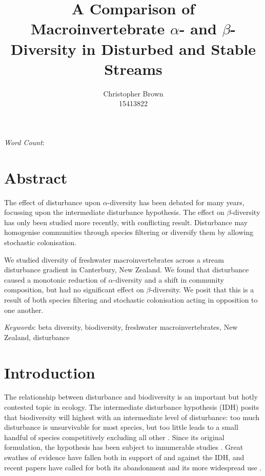 \documentclass[a4paper,10pt]{article}
\title{A Comparison of Macroinvertebrate $\alpha$- and $\beta$-Diversity in Disturbed and Stable Streams}
\author{
	Christopher Brown\\15413822
}
\date{}
\begin{document}
\maketitle

\begin{center}
	\emph{Word Count}: %
\end{center}

\section*{Abstract}

The effect of disturbance upon $\alpha$-diversity has been debated for many years, focussing upon the intermediate disturbance hypothesis.
The effect on $\beta$-diversity has only been studied more recently, with conflicting result.
Disturbance may homogenise communities through species filtering or diversify them by allowing stochastic colonisation.

We studied diversity of freshwater macroinvertebrates across a stream disturbance gradient in Canterbury, New Zealand.
We found that disturbance caused a monotonic reduction of $\alpha$-diversity and a shift in community composition, but had no significant effect on $\beta$-diversity.
We posit that this is a result of both species filtering and stochastic colonisation acting in opposition to one another.

\bigskip\noindent\emph{Keywords}:
beta diversity,
biodiversity,
freshwater macroinvertebrates,
New Zealand,
disturbance

\clearpage

\section*{Introduction}

The relationship between disturbance and biodiversity is an important but hotly contested topic in ecology.
The intermediate disturbance hypothesis (IDH) posits that biodiversity will highest with an intermediate level of disturbance: too much disturbance is unsurvivable for most species, but too little leads to a small handful of species competitively excluding all other \parencite{idh-original}.
Since its original formulation, the hypothesis has been subject to innumerable studies \parencite{disturbance-diversity-predict-test}.
Great swathes of evidence have fallen both in support of and against the IDH, and recent papers have called for both its abandonment \parencite{idh-abandon} and its more widespread use \parencite{idh-patch-dynamics}.
\end{document}
